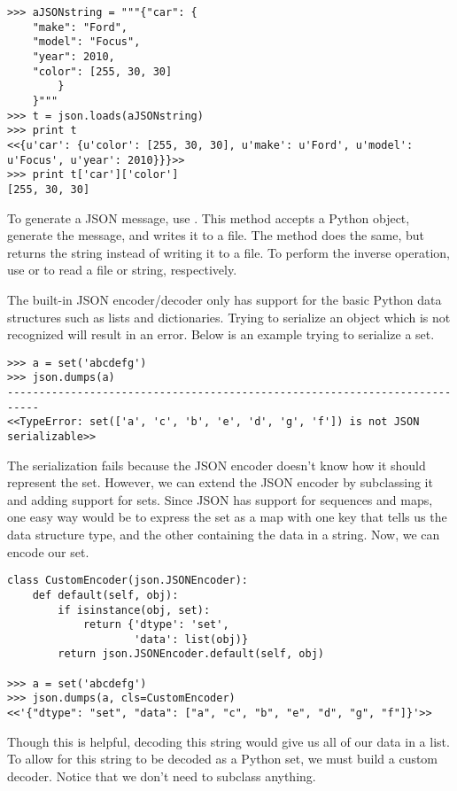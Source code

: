 \begin{lstlisting}
>>> aJSONstring = """{"car": {
    "make": "Ford",
    "model": "Focus",
    "year": 2010,
    "color": [255, 30, 30]
        }
    }"""
>>> t = json.loads(aJSONstring)
>>> print t
<<{u'car': {u'color': [255, 30, 30], u'make': u'Ford', u'model': u'Focus', u'year': 2010}}}>>
>>> print t['car']['color']
[255, 30, 30]
\end{lstlisting}

To generate a JSON message, use .
This method accepts a Python object, generate the message, and writes it to a file.
The method  does the same, but returns the string instead of writing it to a file.
To perform the inverse operation, use  or  to read a file or string, respectively.

The built-in JSON encoder/decoder only has support for the basic Python data structures such as lists and dictionaries.
Trying to serialize an object which is not recognized will result in an error. Below is an example trying to serialize a set.

\begin{lstlisting}
>>> a = set('abcdefg')
>>> json.dumps(a)
---------------------------------------------------------------------------
<<TypeError: set(['a', 'c', 'b', 'e', 'd', 'g', 'f']) is not JSON serializable>>
\end{lstlisting}

The serialization fails because the JSON encoder doesn't know how it should represent the set.
However, we can extend the JSON encoder by subclassing it and adding support for sets.
Since JSON has support for sequences and maps, one easy way would be to express the set as a map with one key that tells us the data structure type, and the other containing the data in a string.
Now, we can encode our set.

\begin{lstlisting}
class CustomEncoder(json.JSONEncoder):
    def default(self, obj):
        if isinstance(obj, set):
            return {'dtype': 'set',
                    'data': list(obj)}
        return json.JSONEncoder.default(self, obj)

>>> a = set('abcdefg')
>>> json.dumps(a, cls=CustomEncoder)
<<'{"dtype": "set", "data": ["a", "c", "b", "e", "d", "g", "f"]}'>>
\end{lstlisting}

Though this is helpful, decoding this string would give us all of our data in a list.
To allow for this string to be decoded as a Python set, we must build a custom decoder.
Notice that we don't need to subclass anything.

